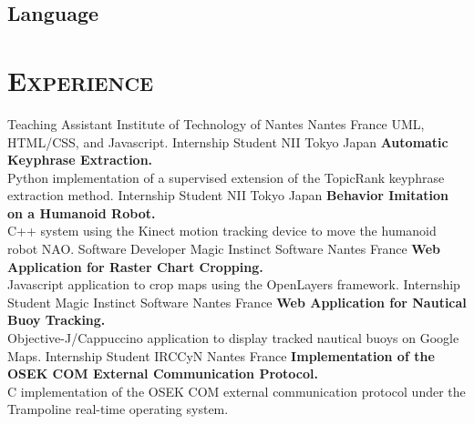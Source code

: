 \documentclass[10pt, a4paper]{moderncv}
\begin{document}
    \subsection{Language}

  \section{\textsc{Experience}}
            {Teaching Assistant}                %
            {Institute of Technology of Nantes} %
            {Nantes}                            %
            {France}                            %
            {UML, HTML/CSS, and Javascript.}    %
            {Internship Student}
            {NII}
            {Tokyo}
            {Japan}
            {\textbf{Automatic Keyphrase Extraction.}\\
             Python implementation of a supervised extension of the TopicRank
             keyphrase extraction method.}
            {Internship Student}
            {NII}
            {Tokyo}
            {Japan}
            {\textbf{Behavior Imitation on a Humanoid Robot.}\\
             C++ system using the Kinect motion tracking device to move the
             humanoid robot NAO.}
            {Software Developer}
            {Magic Instinct Software}
            {Nantes}
            {France}
            {\textbf{Web Application for Raster Chart Cropping.}\\
             Javascript application to crop maps using the OpenLayers
             framework.}
            {Internship Student}
            {Magic Instinct Software}
            {Nantes}
            {France}
            {\textbf{Web Application for Nautical Buoy Tracking.}\\
             Objective-J/Cappuccino application to display tracked nautical
             buoys on Google Maps.}
            {Internship Student}
            {IRCCyN}
            {Nantes}
            {France}
            {\textbf{Implementation of the OSEK COM External Communication
             Protocol.}\\
             C implementation of the OSEK COM external communication protocol
             under the Trampoline real-time operating system.}

  \newpage
  
  
  \nocite{*}
\end{document}

